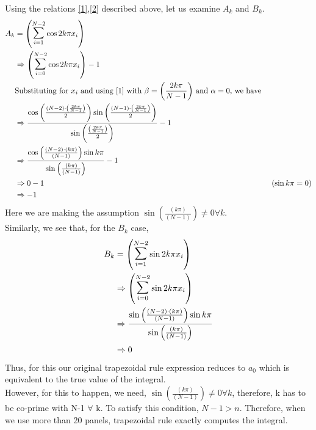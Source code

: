 \documentclass[letterpaper]{exam}
\begin{document}
\begin{questions}
\begin{solution}
Using the relations \ref{1},\ref{2} described above, let us examine $A_k$ and $B_k$.
\begin{align*}
    A_k &= \left( \overset{N-2}{\underset{i = 1}{\mathlarger{\mathlarger{\sum}}}}\cos{2k\pi x_i}\right)\\
    &\Rightarrow 
    \left( \overset{N-2}{\underset{i = 0}{\mathlarger{\mathlarger{\sum}}}}\cos{2k\pi x_i}\right) - 1\\
    &\text{Substituting for $x_i$ and using \ref{1} with $\beta = \left( \frac{2k\pi }{N-1}\right)$ and $\alpha = 0$, we have}\\
    &\Rightarrow
    \frac{\cos{\left(\frac{ (N-2)\cdot \left( \frac{2k\pi }{N-1}\right)}{2}\right)}\sin{\left(\frac{(N-1) \cdot\left( \frac{2k\pi }{N-1}\right)}{2}\right)}}{\sin{\left(\frac{\left( \frac{2k\pi }{N-1}\right)}{2}\right)}} - 1\\
    &\Rightarrow
    \frac{\cos{\left(\frac{ (N-2)\cdot \left( k\pi \right)}{(N-1)}\right)}\sin{ k\pi }}{\sin{\left(\frac{\left( k\pi \right)}{(N-1)}\right)}} - 1\\
    &\Rightarrow
    0 - 1 &\mbox{ ($\sin{k\pi} = 0$)}\\
    &\Rightarrow
    -1
\end{align*}
Here we are making the assumption $\sin{\left(\frac{\left( k\pi \right)}{(N-1)}\right)} \neq 0 \forall k$.\\
Similarly, we see that, for the $B_k$ case,
\begin{align*}
    B_k &= \left( \overset{N-2}{\underset{i = 1}{\mathlarger{\mathlarger{\sum}}}}\sin{2k \pi x_i}\right)\\
    &\Rightarrow
    \left( \overset{N-2}{\underset{i = 0}{\mathlarger{\mathlarger{\sum}}}}\sin{2k \pi x_i}\right)\\
    &\Rightarrow
    \frac{\sin{\left(\frac{ (N-2)\cdot \left( k\pi \right)}{(N-1)}\right)}\sin{ k\pi }}{\sin{\left(\frac{\left( k\pi \right)}{(N-1)}\right)}}\\
    &\Rightarrow 
    0
\end{align*}
Thus, for this our original trapezoidal rule expression reduces to $a_0$ which is equivalent to the true value of the integral.\\
However, for this to happen, we need, $\sin{\left(\frac{\left( k\pi \right)}{(N-1)}\right)} \neq 0 \forall k$, therefore, k has to be co-prime with N-1 $\forall$ k. To satisfy this condition, $N-1 > n$. Therefore, when we use more than 20 panels, trapezoidal rule exactly computes the integral.
\end{solution}

\end{questions}
\end{document}
